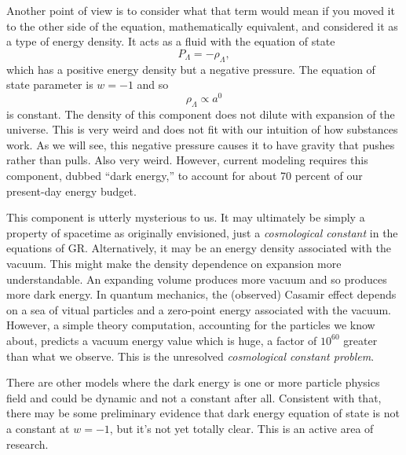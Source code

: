 Another point of view is to consider what that term would mean if you moved it to the other side of the equation, mathematically equivalent, and considered it as a type of energy density.  It acts as a fluid with the equation of state
\begin{equation}
  P_\Lambda = -\rho_\Lambda,
\end{equation}
which has a positive energy density but a negative pressure.  The equation of state parameter is $w=-1$ and so
\begin{equation}
  \rho_\Lambda \propto a^0
\end{equation}
is constant.  The density of this component does not dilute with expansion of the universe.  This is very weird and  does not fit with our intuition of how substances work.  As we will see, this negative pressure causes it to have gravity that pushes rather than pulls.  Also very weird.  However, current modeling requires this component, dubbed ``dark energy,'' to account for about 70 percent of our present-day energy budget.

This component is utterly mysterious to us.  It may ultimately be simply a property of spacetime as originally envisioned, just a \textit{cosmological constant} in the equations of GR.  Alternatively, it may be an energy density associated with the vacuum.  This might make the density dependence on expansion more understandable.  An expanding volume produces more vacuum and so produces more dark energy.  In quantum mechanics, the (observed) Casamir effect depends on a sea of vitual particles and a zero-point energy associated with the vacuum.  However, a simple theory computation, accounting for the particles we know about, predicts a vacuum energy value which is huge, a factor of $10^{60}$ greater than what we observe.  This is the unresolved \textit{cosmological constant problem}.

There are other models where the dark energy is one or more particle physics field and could be dynamic and not a constant after all.  Consistent with that, there may be some preliminary evidence that dark energy equation of state is not a constant at $w = -1$, but it's not yet totally clear.   This is an active area of research.


